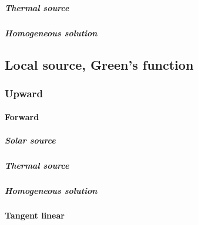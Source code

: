 \subparagraph{Thermal source}
\label{sec:source_function_integration-local_source_classical-downward-adjoint_of_tanget_linear-thermal_source}

\subparagraph{Homogeneous solution}
\label{sec:source_function_integration-local_source_classical-downward-adjoint_of_tanget_linear-homogeneous_solution}


%
\subsection{Local source, Green's function}
\label{sec:source_function_integration-local_source_greens_function}


%
\subsubsection{Upward}
\label{sec:source_function_integration-local_source_greens_function-upward}


%
\paragraph{Forward}
\label{sec:source_function_integration-local_source_greens_function-upward-forward}


\subparagraph{Solar source}
\label{sec:source_function_integration-local_source_greens_function-upward-forward-solar_source}


\subparagraph{Thermal source}
\label{sec:source_function_integration-local_source_greens_function-upward-forward-thermal_source}


\subparagraph{Homogeneous solution}
\label{sec:source_function_integration-local_source_greens_function-upward-forward-homogeneous_solution}


%
\paragraph{Tangent linear}
\label{sec:source_function_integration-local_source_greens_function-upward-tangent_linear}

